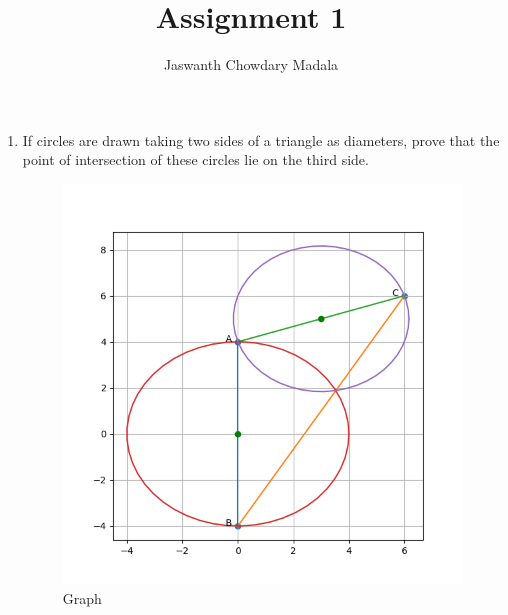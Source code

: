 \documentclass[journal,12pt,twocolumn]{IEEEtran}
\begin{document}
\vspace{3cm}


\title{Assignment 1}
\author{Jaswanth Chowdary Madala}





\maketitle

\newpage


\bigskip

\renewcommand{\thefigure}{\theenumi}
\renewcommand{\thetable}{\theenumi}


\begin{enumerate}
\item If circles are drawn taking two sides of a triangle as diameters, prove that the point of intersection of these circles lie on the third side.
\begin{figure}[ht]
\centering
\includegraphics[width = \columnwidth]{"./figs/fig.png"}
\caption{Graph}
\label{fig:1}
\end{figure}


\end{enumerate}
\end{document}
